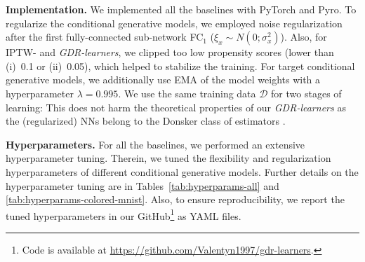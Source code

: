 \documentclass[dvipsnames]{article} %
\newcommand{\GDRlearners}{\emph{GDR-learners}\xspace}
\begin{document}
\textbf{Implementation.} We implemented all the baselines with PyTorch and Pyro. To regularize the conditional generative models, we employed noise regularization \citep{rothfuss2019noise} after the first fully-connected sub-network FC$_1$ ($\xi_x \sim N(0; \sigma^2_x)$). Also, for IPTW- and \GDRlearners, we clipped too low propensity scores (lower than (i)~0.1 or (ii)~0.05), which helped to stabilize the training. For target conditional generative models, we additionally use EMA of the model weights \citep{polyak1992acceleration} with a hyperparameter $\lambda = 0.995$. We use the same training data $\mathcal{D}$ for two stages of learning: This does not harm the theoretical properties of our \GDRlearners as the (regularized) NNs belong to the Donsker class of estimators \citep{van2000asymptotic,kennedy2024semiparametric}.

\textbf{Hyperparameters.} For all the baselines, we performed an extensive hyperparameter tuning. Therein, we tuned the flexibility and regularization hyperparameters of different conditional generative models. Further details on the hyperparameter tuning are in Tables~\ref{tab:hyperparams-all} and \ref{tab:hyperparams-colored-mnist}. Also, to ensure reproducibility, we report the tuned hyperparameters in our GitHub\footnote{Code is available at \url{https://github.com/Valentyn1997/gdr-learners}.} as YAML files.
\end{document}
